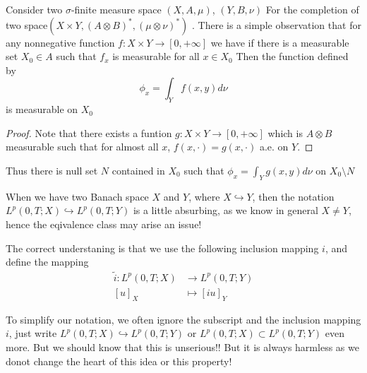 \documentclass{beamer}
\begin{document}
\begin{frame}
  
Consider two $\sigma$-finite measure space $(X, A, \mu)$, $(Y, B, \nu)$
For the completion of two space$(X\times Y, (A\otimes B)^{*}, (\mu \otimes \nu)^*)$
. There is a simple observation that for any nonnegative function $f:X\times Y\to [0, +\infty]$
we have if there is a measurable set $X_0\in A$ such that $f_x$ is measurable for all $x\in X_0$
Then the function defined by
\begin{equation*}
  \phi_x=\int_{Y}f(x,y)d\nu
\end{equation*}
is measurable on $X_0$
\begin{proof}
  Note that there exists a funtion $g:X\times Y\to [0, +\infty]$ which is $A\otimes B$ measurable
  such that for almost all $x$, $f(x, \cdot)=g(x, \cdot)$ a.e. on $Y$.
\end{proof}
 Thus there is null set $N$ contained in $X_0$ such 
 that $\phi_x=\int_{Y}g(x,y)d\nu$ on $X_0\setminus N$

\end{frame}

\begin{frame}
  When we have two Banach space $X$ and $Y$, where $X\hookrightarrow Y$, then the notation $L^p(0,T; X) \hookrightarrow L^p(0,T; Y)$
is a little absurbing, as we know in general $X\neq Y$, hence the eqivalence class may arise an issue!

The correct understaning is that we use the following inclusion mapping $i$, and define the mapping 
\begin{align*}
    \tilde{i}: L^p(0,T; X) & \to L^p(0,T; Y) \\
    [u]_{\scriptscriptstyle X} & \mapsto [iu]_{\scriptscriptstyle Y}
\end{align*}



To simplify our notation, we often ignore the subscript and the inclusion mapping $i$, just write $L^p(0,T; X) \hookrightarrow L^p(0,T; Y)$
or $L^p(0,T; X) \subset L^p(0,T; Y)$ even more. But we should know that this is unserious!!
But it is always harmless as we donot change the heart of this idea or this property!

\end{frame}
\end{document}
